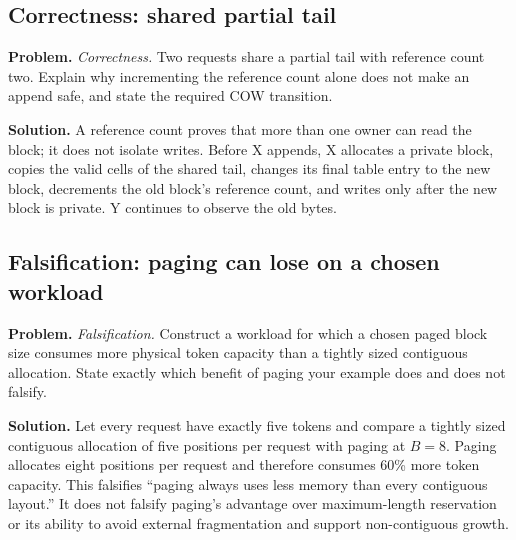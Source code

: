 \subsection{Correctness: shared partial tail}
\textbf{Problem.} \emph{Correctness.} Two requests share a partial tail with reference
count two. Explain why incrementing the reference count alone does not make an
append safe, and state the required COW transition.

\textbf{Solution.} A reference count proves that more than one owner can read the block; it does
not isolate writes. Before X appends, X allocates a private block, copies the
valid cells of the shared tail, changes its final table entry to the new
block, decrements the old block's reference count, and writes only after the
new block is private. Y continues to observe the old bytes.

\subsection{Falsification: paging can lose on a chosen workload}
\textbf{Problem.} \emph{Falsification.} Construct a workload for which a chosen paged
block size consumes more physical token capacity than a tightly sized
contiguous allocation. State exactly which benefit of paging your example
does and does not falsify.

\textbf{Solution.} Let every request have exactly five tokens and compare a tightly sized
contiguous allocation of five positions per request with paging at $B=8$.
Paging allocates eight positions per request and therefore consumes 60\% more
token capacity. This falsifies ``paging always uses less memory than every
contiguous layout.'' It does not falsify paging's advantage over
maximum-length reservation or its ability to avoid external fragmentation and
support non-contiguous growth.
